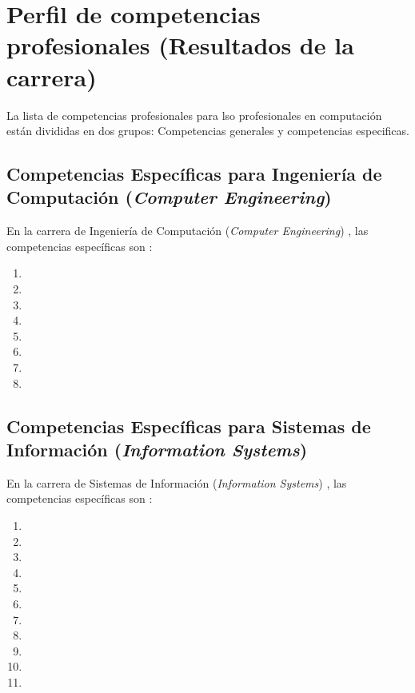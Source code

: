 \section{Perfil de competencias profesionales (Resultados de la carrera)}\label{sec:competencies}
La lista de competencias profesionales para lso profesionales en computación están divididas en dos grupos: Competencias generales y competencias especificas.




\subsection{Competencias Específicas para Ingeniería de Computación (\textit{Computer Engineering})}
En la carrera de Ingeniería de Computación (\textit{Computer Engineering}) \cite{ComputerEngineering2004}, las competencias específicas son \cite{IEEECompetences}:
\begin{enumerate}
\renewcommand{\theenumi}{CE\arabic{enumi}}
\item {}
\item {}
\item {}
\item {}
\item {}
\item {}
\item {}
\item {}
\end{enumerate}

\subsection{Competencias Específicas para Sistemas de Información (\textit{Information Systems})}
En la carrera de Sistemas de Información (\textit{Information Systems}) \cite{InformationSystemsCurricula2010, InformationSystems2002Journal}, las competencias específicas son \cite{IEEECompetences}:
\begin{enumerate}
\renewcommand{\theenumi}{IS\arabic{enumi}}
\item {}
\item {}
\item {}
\item {}
\item {}
\item {}
\item {}
\item {}
\item {}
\item {}
\item {}
\end{enumerate}

